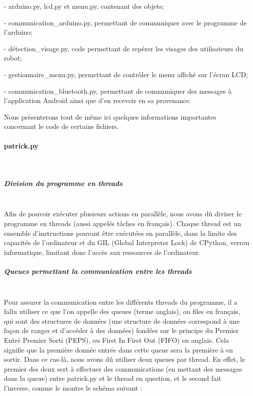 \documentclass[12pt,a4paper]{article}
\begin{document}
	- arduino.py, lcd.py et menu.py, contenant des objets;
	
	- communication\_arduino.py, permettant de communiquer avec le programme de l'arduino;
	
	- détection\_visage.py, code permettant de repérer les visages des utilisateurs du robot;
	
	- gestionnaire\_menu.py, permettant de contrôler le menu affiché sur l'écran LCD;
	
	- communication\_bluetooth.py, permettant de communiquer des messages à l'application Android ainsi que d'en recevoir en sa provenance.
	
	Nous présenterons tout de même ici quelques informations importantes concernant le code de certains fichiers.	
	
	\paragraph{patrick.py}\mbox{}\\
	
	\subparagraph{Division du programme en threads}\mbox{}\\
	
	Afin de pouvoir exécuter plusieurs actions en parallèle, nous avons dû diviser le programme en threads (aussi appelés tâches en français). Chaque thread est un ensemble d'instructions pouvant être exécutées en parallèle, dans la limite des capacités de l’ordinateur et du GIL (Global Interpreter Lock) de CPython, verrou informatique, limitant donc l’accès aux ressources de l’ordinateur.
	
	\subparagraph{Queues permettant la communication entre les threads}\mbox{}\\
	
	Pour assurer la communication entre les différents threads du programme, il a fallu utiliser ce que l’on appelle des queues (terme anglais), ou files en français, qui sont des structures de données (une structure de données correspond à une façon de ranger et d’accéder à des données) fondées sur le principe du Premier Entré Premier Sorti (PEPS), ou First In First Out (FIFO) en anglais. Cela signifie que la première donnée entrée dans cette queue sera la première à en sortir. Dans ce cas-là, nous avons dû utiliser deux queues par thread. En effet, le premier des deux sert à effectuer des communications (en mettant des messages dans la queue) entre patrick.py et le thread en question, et le second fait l’inverse, comme le montre le schéma suivant :
	
\end{document}
